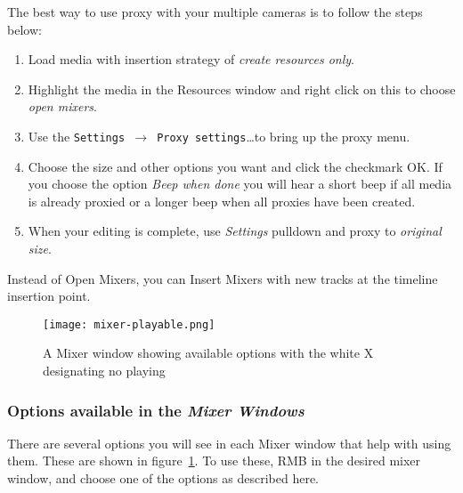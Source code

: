 The best way to use proxy with your multiple cameras is to follow the steps below:

\begin{enumerate}
    \item Load media with insertion strategy of \textit{create resources only}.
    \item Highlight the media in the Resources window and right click on this to choose \textit{open mixers}.
    \item Use the \texttt{Settings $\rightarrow$ Proxy settings}\dots to bring up the proxy menu.
    \item Choose the size and other options you want and click the checkmark OK. If you choose the option \textit{Beep when done} you will hear a short beep if all media is already proxied or a longer beep when all proxies have been created.
    \item When your editing is complete, use \textit{Settings} pulldown and proxy to \textit{original size}.
\end{enumerate}
Instead of Open Mixers, you can Insert Mixers with new tracks at the timeline insertion point.

\begin{figure}[htpb]
    \centering
    \texttt{[image: mixer-playable.png]}
    \caption{A Mixer window showing available options with the white X designating no playing}
    \label{fig:mixer-playable}
\end{figure}

\subsubsection*{Options available in the \textit{Mixer Windows}}%
\label{ssub:options_available_with_mixers}

There are several options you will see in each Mixer window that help with using them. These
are shown in figure~\ref{fig:mixer-playable}. To use these, RMB in the desired mixer window,
and choose one of the options as described here.

